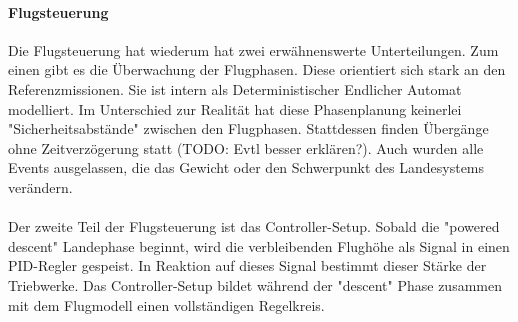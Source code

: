 \paragraph{Flugsteuerung}
Die Flugsteuerung hat wiederum hat zwei erwähnenswerte Unterteilungen. Zum einen gibt es die Überwachung der Flugphasen. Diese orientiert sich stark an den Referenzmissionen. Sie ist intern als Deterministischer Endlicher Automat  modelliert. Im Unterschied zur Realität hat diese Phasenplanung keinerlei "Sicherheitsabstände" zwischen den Flugphasen. Stattdessen finden Übergänge ohne Zeitverzögerung statt (TODO: Evtl besser erklären?). Auch wurden alle Events ausgelassen, die das Gewicht oder den Schwerpunkt des Landesystems verändern.\\ \\

Der zweite Teil der Flugsteuerung ist das Controller-Setup. Sobald die "powered descent" Landephase beginnt, wird die verbleibenden Flughöhe als Signal in einen PID-Regler gespeist. In Reaktion auf dieses Signal bestimmt dieser Stärke der Triebwerke. Das Controller-Setup bildet während der "descent" Phase zusammen mit dem Flugmodell einen vollständigen Regelkreis.

